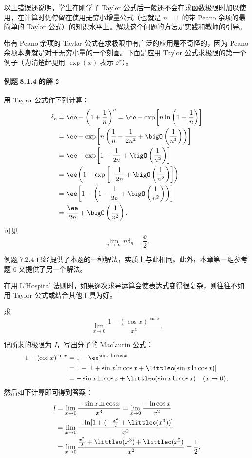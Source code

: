 以上错误还说明，学生在刚学了 Taylor 公式后一般还不会在求函数极限时加以使用，在计算时仍停留在使用无穷小增量公式（也就是 $n=1$ 的带 Peano 余项的最简单的 Taylor 公式）的知识水平上。解决这个问题的方法是实践和教师的引导。

带有 Peano 余项的 Taylor 公式在求极限中有广泛的应用是不奇怪的，因为 Peano 余项本身就是对于无穷小量的一个刻画。下面是应用 Taylor 公式求极限的第一个例子（为清楚起见用 $\exp(x)$ 表示 $\ee^x$）。

\paragraph{例题 8.1.4 的解 2}
用 Taylor 公式作下列计算：
\begin{align*}
  \delta_n
  &=\ee-\left(1+\frac1n\right)^n
   =\ee-\exp\left[n\ln\left(1+\frac1n\right)\right]\\
  &=\ee-\exp\left[n\left(\frac1n-\frac1{2n^2}+\bigO\left(\frac1{n^3}\right)\right)\right]\\
  &=\ee-\exp\left[1-\frac1{2n}+\bigO\left(\frac1{n^2}\right)\right]\\
  &=\ee\left(1-\exp\left[-\frac1{2n}+\bigO\left(\frac1{n^2}\right)\right]\right)\\
  &=\ee\left[1-\left(1-\frac1{2n}+\bigO\left(\frac1{n^2}\right)\right)\right]\\
  &=\frac{\ee}{2n}+\bigO\left(\frac1{n^2}\right).
\end{align*}
可见
\[
  \lim_{n\to\infty}n\delta_n=\frac{\ee}{2}.
\]
\begin{xremark}
例题 7.2.4 已经提供了本题的一种解法，实质上与此相同。此外，本章第一组参考题 6 又提供了另一个解法。
\end{xremark}

在用 L'Hospital 法则时，如果逐次求导运算会使表达式变得很复杂，则往往不如用 Taylor 公式或结合其他工具为好。

\begin{xexample}[8.1.7]
求
\[
  \lim_{x\to0}\frac{1-(\cos x)^{\sin x}}{x^3}.
\]
\end{xexample}
\begin{xsolution}
记所求的极限为 $I$，写出分子的 Maclaurin 公式：
\begin{align*}
  1-(\cos x)^{\sin x}
  &=1-\ee^{\sin x\ln\cos x}\\
  &=1-[1+\sin x\ln\cos x+\littleo(\sin x\ln\cos x)]\\
  &=-\sin x\ln\cos x+\littleo(\sin x\ln\cos x)\quad(x\to0),
\end{align*}
然后如下计算即可得到答案：
\begin{align*}
  I
  &=\lim_{x\to0}\frac{-\sin x\ln\cos x}{x^3}
   =\lim_{x\to0}\frac{-\ln\cos x}{x^2}\\
  &=\lim_{x\to0}\frac{-\ln[1+(-\frac{x^2}{2}+\littleo(x^3))]}{x^2}\\
  &=\lim_{x\to0}\frac{\frac{x^2}{2}+\littleo(x^3)+\littleo(x^2)}{x^2}
   =\frac12.
\end{align*}
\end{xsolution}

